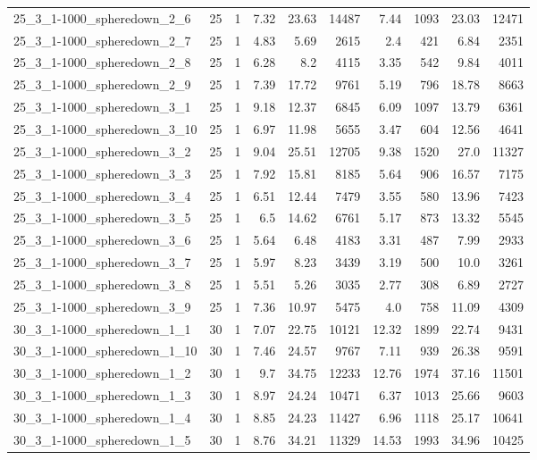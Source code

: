 \begin{center}
\begin{scriptsize}
\begin{longtable}{lrrrrrrrrr}
25\_3\_1-1000\_spheredown\_2\_6 & 25 & 1 & 7.32 & 23.63 & 14487 & 7.44 & 1093 & 23.03 & 12471\\
25\_3\_1-1000\_spheredown\_2\_7 & 25 & 1 & 4.83 & 5.69 & 2615 & 2.4 & 421 & 6.84 & 2351\\
25\_3\_1-1000\_spheredown\_2\_8 & 25 & 1 & 6.28 & 8.2 & 4115 & 3.35 & 542 & 9.84 & 4011\\
25\_3\_1-1000\_spheredown\_2\_9 & 25 & 1 & 7.39 & 17.72 & 9761 & 5.19 & 796 & 18.78 & 8663\\
25\_3\_1-1000\_spheredown\_3\_1 & 25 & 1 & 9.18 & 12.37 & 6845 & 6.09 & 1097 & 13.79 & 6361\\
25\_3\_1-1000\_spheredown\_3\_10 & 25 & 1 & 6.97 & 11.98 & 5655 & 3.47 & 604 & 12.56 & 4641\\
25\_3\_1-1000\_spheredown\_3\_2 & 25 & 1 & 9.04 & 25.51 & 12705 & 9.38 & 1520 & 27.0 & 11327\\
25\_3\_1-1000\_spheredown\_3\_3 & 25 & 1 & 7.92 & 15.81 & 8185 & 5.64 & 906 & 16.57 & 7175\\
25\_3\_1-1000\_spheredown\_3\_4 & 25 & 1 & 6.51 & 12.44 & 7479 & 3.55 & 580 & 13.96 & 7423\\
25\_3\_1-1000\_spheredown\_3\_5 & 25 & 1 & 6.5 & 14.62 & 6761 & 5.17 & 873 & 13.32 & 5545\\
25\_3\_1-1000\_spheredown\_3\_6 & 25 & 1 & 5.64 & 6.48 & 4183 & 3.31 & 487 & 7.99 & 2933\\
25\_3\_1-1000\_spheredown\_3\_7 & 25 & 1 & 5.97 & 8.23 & 3439 & 3.19 & 500 & 10.0 & 3261\\
25\_3\_1-1000\_spheredown\_3\_8 & 25 & 1 & 5.51 & 5.26 & 3035 & 2.77 & 308 & 6.89 & 2727\\
25\_3\_1-1000\_spheredown\_3\_9 & 25 & 1 & 7.36 & 10.97 & 5475 & 4.0 & 758 & 11.09 & 4309\\
30\_3\_1-1000\_spheredown\_1\_1 & 30 & 1 & 7.07 & 22.75 & 10121 & 12.32 & 1899 & 22.74 & 9431\\
30\_3\_1-1000\_spheredown\_1\_10 & 30 & 1 & 7.46 & 24.57 & 9767 & 7.11 & 939 & 26.38 & 9591\\
30\_3\_1-1000\_spheredown\_1\_2 & 30 & 1 & 9.7 & 34.75 & 12233 & 12.76 & 1974 & 37.16 & 11501\\
30\_3\_1-1000\_spheredown\_1\_3 & 30 & 1 & 8.97 & 24.24 & 10471 & 6.37 & 1013 & 25.66 & 9603\\
30\_3\_1-1000\_spheredown\_1\_4 & 30 & 1 & 8.85 & 24.23 & 11427 & 6.96 & 1118 & 25.17 & 10641\\
30\_3\_1-1000\_spheredown\_1\_5 & 30 & 1 & 8.76 & 34.21 & 11329 & 14.53 & 1993 & 34.96 & 10425\\

\end{longtable}
\end{scriptsize}
\end{center}
